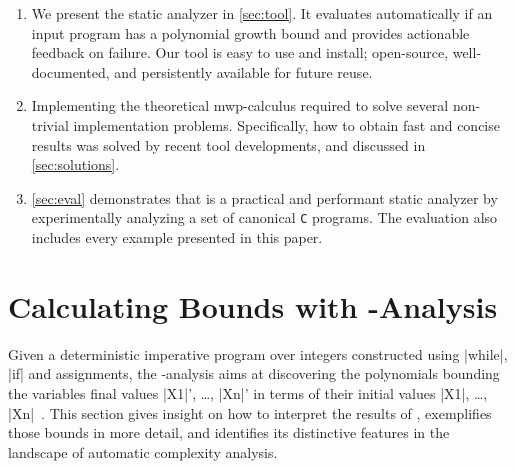 \documentclass[runningheads]{llncs}
\begin{document}
\begin{enumerate}
\item %
We present the static analyzer \pymwp{ }in \autoref{sec:tool}. 
It evaluates automatically if an input program has a polynomial growth bound and provides actionable feedback on failure. 
Our tool is easy to use and install; open-source, well-documented, and persistently available for future reuse.

%
\item %
Implementing the theoretical mwp-calculus required to solve several non-trivial implementation problems.
Specifically, how to obtain fast and concise results was solved by recent tool developments, and discussed in \autoref{sec:solutions}.

%
\item %
\autoref{sec:eval} demonstrates that \pymwp is a practical and performant static analyzer by experimentally analyzing a set of canonical \texttt{C} programs.
The evaluation also includes every example presented in this paper.
\end{enumerate}

\section{Calculating Bounds with \mwp-Analysis} %
\label{sec:idea}

Given a deterministic imperative program over integers constructed using \prc|while|, \prc|if| and assignments, the \mwp-analysis aims at discovering the polynomials bounding the variables final values \prc|X1|', \ldots, \prc|Xn|' in terms of their initial values \prc|X1|, \ldots, \prc|Xn|~\cite[p.~5]{Jones2009}.
This section gives insight on how to interpret the results of \pymwp, exemplifies those bounds in more detail, 
and identifies its distinctive features in the landscape of automatic complexity analysis.
\end{document}
